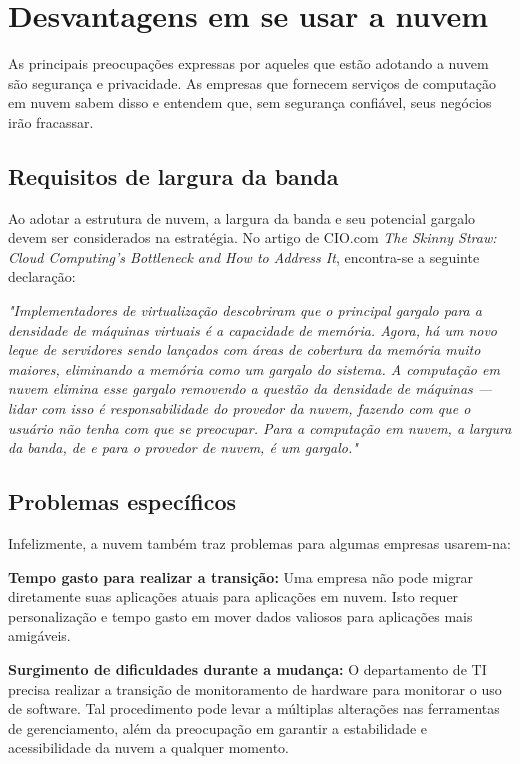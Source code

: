 \section{Desvantagens em se usar a nuvem}

As principais preocupações expressas por aqueles que estão adotando a nuvem são
segurança e privacidade. As empresas que fornecem serviços de computação em nuvem
sabem disso e entendem que, sem segurança confiável, seus negócios irão
fracassar.

\subsection{Requisitos de largura da banda}

Ao adotar a estrutura de nuvem, a largura da banda e seu potencial gargalo devem ser
considerados na estratégia. No artigo de CIO.com \emph{The Skinny Straw: Cloud
Computing's Bottleneck and How to Address It}, encontra-se a seguinte declaração:

\begin{displayquote}
\emph{
    "Implementadores de virtualização descobriram que o principal gargalo para a 
    densidade de máquinas virtuais é a capacidade de memória. Agora, há um novo
    leque de servidores sendo lançados com áreas de cobertura da memória muito
    maiores, eliminando a memória como um gargalo do sistema. A computação em nuvem
    elimina esse gargalo removendo a questão da densidade de máquinas --- lidar com
    isso é responsabilidade do provedor da nuvem, fazendo com que o usuário não tenha
    com que se preocupar.
    Para a computação em nuvem, a largura da banda, de e para o provedor de nuvem,
    é um gargalo."
}
\end{displayquote}

\subsection{Problemas específicos}

Infelizmente, a nuvem também traz problemas para algumas empresas usarem-na:

\newcommand{\itemm}[1]{\item\textbf{#1}}

\begin{itemise}

    \itemm{Tempo gasto para realizar a transição:} Uma empresa não pode migrar
    diretamente suas aplicações atuais para aplicações em nuvem. Isto requer
    personalização e tempo gasto em mover dados valiosos para aplicações mais
    amigáveis.

    \itemm{Surgimento de dificuldades durante a mudança:} O departamento de TI
    precisa realizar a transição de monitoramento de hardware para monitorar o uso
    de software. Tal procedimento pode levar a múltiplas alterações nas ferramentas de
    gerenciamento, além da preocupação em garantir a estabilidade e acessibilidade
    da nuvem a qualquer momento.

\end{itemise}

\undef\itemm
